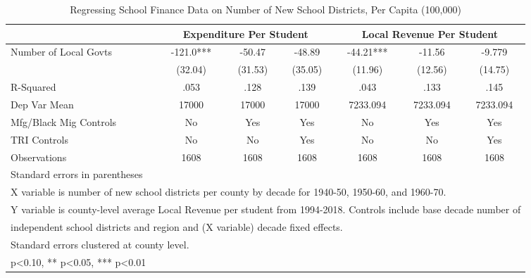 \begin{table}[htbp]\centering
\def\sym#1{\ifmmode^{#1}\else\(^{#1}\)\fi}
\caption{Regressing School Finance Data on Number of New School Districts, Per Capita (100,000)}
\begin{tabular}{l*{6}{c}}
\toprule
                &\multicolumn{3}{c}{Expenditure Per Student}&\multicolumn{3}{c}{Local Revenue Per Student}\\\cmidrule(lr){2-4}\cmidrule(lr){5-7}
\midrule
Number of Local Govts&   -121.0***&   -50.47   &   -48.89   &   -44.21***&   -11.56   &   -9.779   \\
                &  (32.04)   &  (31.53)   &  (35.05)   &  (11.96)   &  (12.56)   &  (14.75)   \\
\midrule
R-Squared       &     .053   &     .128   &     .139   &     .043   &     .133   &     .145   \\
Dep Var Mean    &    17000   &    17000   &    17000   & 7233.094   & 7233.094   & 7233.094   \\
Mfg/Black Mig Controls&       No   &      Yes   &      Yes   &       No   &      Yes   &      Yes   \\
TRI Controls    &       No   &       No   &      Yes   &       No   &       No   &      Yes   \\
Observations    &     1608   &     1608   &     1608   &     1608   &     1608   &     1608   \\
\bottomrule
\multicolumn{7}{l}{\footnotesize Standard errors in parentheses}\\
\multicolumn{7}{l}{\footnotesize X variable is number of new school districts per county by decade for 1940-50, 1950-60, and 1960-70.}\\
\multicolumn{7}{l}{\footnotesize Y variable is county-level average Local Revenue per student from 1994-2018. Controls include base decade number of }\\
\multicolumn{7}{l}{\footnotesize independent school districts and region and (X variable) decade fixed effects.}\\
\multicolumn{7}{l}{\footnotesize Standard errors clustered at county level.}\\
\multicolumn{7}{l}{\footnotesize * p<0.10, ** p<0.05, *** p<0.01}\\
\end{tabular}
\end{table}
